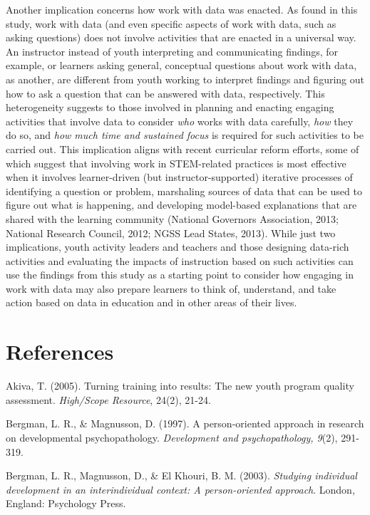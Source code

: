 \documentclass[]{msu-thesis}
\theoremstyle{definition}
\theoremstyle{definition}
\theoremstyle{definition}
\theoremstyle{remark}
\begin{document}
Another implication concerns how work with data was enacted. As found in
this study, work with data (and even specific aspects of work with data,
such as asking questions) does not involve activities that are enacted
in a universal way. An instructor instead of youth interpreting and
communicating findings, for example, or learners asking general,
conceptual questions about work with data, as another, are different
from youth working to interpret findings and figuring out how to ask a
question that can be answered with data, respectively. This
heterogeneity suggests to those involved in planning and enacting
engaging activities that involve data to consider \emph{who} works with
data carefully, \emph{how} they do so, and \emph{how much time and
sustained focus} is required for such activities to be carried out. This
implication aligns with recent curricular reform efforts, some of which
suggest that involving work in STEM-related practices is most effective
when it involves learner-driven (but instructor-supported) iterative
processes of identifying a question or problem, marshaling sources of
data that can be used to figure out what is happening, and developing
model-based explanations that are shared with the learning community
(National Governors Association, 2013; National Research Council, 2012;
NGSS Lead States, 2013). While just two implications, youth activity
leaders and teachers and those designing data-rich activities and
evaluating the impacts of instruction based on such activities can use
the findings from this study as a starting point to consider how
engaging in work with data may also prepare learners to think of,
understand, and take action based on data in education and in other
areas of their lives.

\chapter{References}\label{references}

\setlength{\parindent}{-0.2in} \setlength{\leftskip}{0.2in}
\setlength{\parskip}{8pt} \noindent

Akiva, T. (2005). Turning training into results: The new youth program
quality assessment. \emph{High/Scope Resource}, 24(2), 21-24.

Bergman, L. R., \& Magnusson, D. (1997). A person-oriented approach in
research on developmental psychopathology. \emph{Development and
psychopathology, 9}(2), 291-319.

Bergman, L. R., Magnusson, D., \& El Khouri, B. M. (2003).
\emph{Studying individual development in an interindividual context: A
person-oriented approach}. London, England: Psychology Press.
\end{document}
